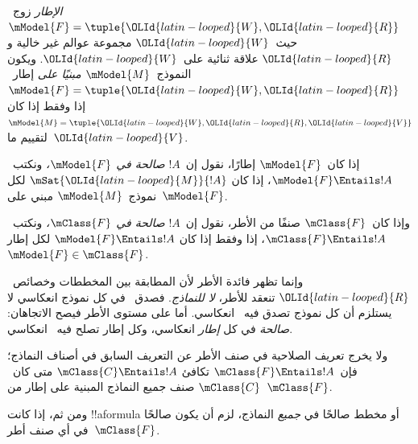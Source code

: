 \documentclass[../../../include/open-logic-section]{subfiles}
\begin{document}


\begin{defn}
  \emph{الإطار} زوج~$\mModel{F} = \tuple{\OLId{latin-looped}{W},\OLId{latin-looped}{R}}$ حيث~$\OLId{latin-looped}{W}$ مجموعة عوالم
  غير خالية و$\OLId{latin-looped}{R}$ علاقة ثنائية على~$\OLId{latin-looped}{W}$. ويكون النموذج~$\mModel{M}$
  \emph{مبنيًا على} إطار~$\mModel{F} = \tuple{\OLId{latin-looped}{W},\OLId{latin-looped}{R}}$ إذا وفقط إذا كان
  $\mModel{M} = \tuple{\OLId{latin-looped}{W}, \OLId{latin-looped}{R}, \OLId{latin-looped}{V}}$ لتقييم ما~$\OLId{latin-looped}{V}$.
\end{defn}

\begin{defn}
  إذا كان~$\mModel{F}$ إطارًا، نقول إن~$!A$ \emph{صالحة في
    $\mModel{F}$،} ونكتب~$\mModel{F} \Entails !A$، إذا كان
  $\mSat{\OLId{latin-looped}{M}}{!A}$ لكل نموذج~$\mModel{M}$ مبني على~$\mModel{F}$.

  وإذا كان~$\mClass{F}$ صنفًا من الأطر، نقول إن~$!A$ \emph{صالحة في
    $\mClass{F}$،} ونكتب~$\mClass{F} \Entails !A$، إذا وفقط إذا كان
  $\mModel{F} \Entails !A$ لكل إطار~$\mModel{F} \in \mClass{F}$.
\end{defn}

وإنما تظهر فائدة الأطر لأن المطابقة بين المخططات وخصائص~$\OLId{latin-looped}{R}$
تنعقد للأطر، \emph{لا للنماذج}. فصدق~ في كل نموذج انعكاسي
لا يستلزم أن كل نموذج تصدق فيه~ انعكاسي.
أما على مستوى الأطر فيصح الاتجاهان:  \emph{صالحة} في كل
\emph{إطار} انعكاسي، وكل إطار تصلح فيه~ انعكاسي.

\begin{rem}
ولا يخرج تعريف الصلاحية في صنف الأطر عن التعريف السابق في أصناف
النماذج؛ فإن~$\mClass{F} \Entails !A$ تكافئ
$\mClass{C} \Entails !A$ متى كان~$\mClass{C}$ صنف جميع النماذج
المبنية على إطار من~$\mClass{F}$.

ومن ثم، إذا كانت !!a{formula} أو مخطط صالحًا في \emph{جميع}
النماذج، لزم أن يكون صالحًا في أي صنف أطر~$\mClass{F}$.
\end{rem}
\end{document}
